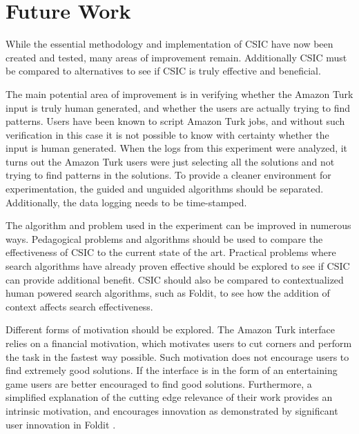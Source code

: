 \section{Future Work}\label{sec:future-work}

While the essential methodology and implementation of CSIC have now been created and tested, many areas of improvement remain.  Additionally CSIC must be compared to alternatives to see if CSIC is truly effective and beneficial.

The main potential area of improvement is in verifying whether the Amazon Turk input is truly human generated, and whether the users are actually trying to find patterns.  Users have been known to script Amazon Turk jobs, and without such verification in this case it is not possible to know with certainty whether the input is human generated.  When the logs from this experiment were analyzed, it turns out the Amazon Turk users were just selecting all the solutions and not trying to find patterns in the solutions.  To provide a cleaner environment for experimentation, the guided and unguided algorithms should be separated.  Additionally, the data logging needs to be time-stamped.

The algorithm and problem used in the experiment can be improved in numerous ways.  Pedagogical problems and algorithms should be used to compare the effectiveness of CSIC to the current state of the art.  Practical problems where search algorithms have already proven effective should be explored to see if CSIC can provide additional benefit.  CSIC should also be compared to contextualized human powered search algorithms, such as Foldit, to see how the addition of context affects search effectiveness.  

Different forms of motivation should be explored.  The Amazon Turk interface relies on a financial motivation, which motivates users to cut corners and perform the task in the fastest way possible.  Such motivation does not encourage users to find extremely good solutions.  If the interface is in the form of an entertaining game users are better encouraged to find good solutions.  Furthermore, a simplified explanation of the cutting edge relevance of their work provides an intrinsic motivation, and encourages innovation as demonstrated by significant user innovation in Foldit \citep{moore12:_foldit_game_leads_to_aids_resear_break}.

